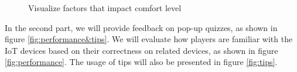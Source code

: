 \documentclass[msc,deptreport,ai]{infthesis}      %
\begin{document}
\begin{figure}[htbp]
\center
{}\hspace{-1pt}%
\hspace{-1pt}%
\caption{Visualize factors that impact comfort level}
\label{fig:visualze}
\end{figure}

In the second part, we will provide feedback on pop-up quizzes, as shown in figure \ref{fig:performance&tips}. We will evaluate how players are familiar with the IoT devices based on their correctness on related devices, as shown in figure \ref{fig:performance}. The usage of tips will also be presented in figure \ref{fig:tips}.
\end{document}
